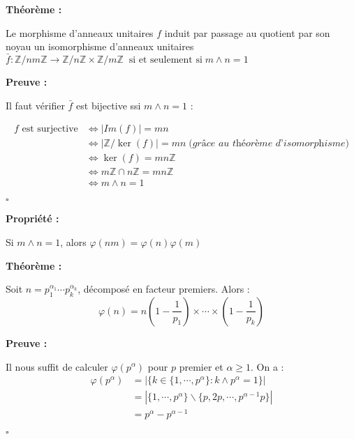 \documentclass{report}
\renewenvironment{leftbar}{%
  \def\FrameCommand{\vrule width 0.4pt \hspace{10pt}}%
  \MakeFramed {\advance\hsize-\width \FrameRestore}}%
 {\endMakeFramed}%
\newenvironment{preuve}{\vspace*{0.5cm}
    \begin{leftbar}
    \noindent\textbf{Preuve :}\par}{
    \begin{flushright}
    $\square$
    \end{flushright}
    \end{leftbar}
}
\newenvironment{prop}{\begin{tcolorbox}[colframe= white]
    \textbf{Propriété :}
     \par}
    {\end{tcolorbox}}
\newenvironment{theoreme}[1][]{
    \begin{tcolorbox}[]
    \textbf{Théorème :} #1  \par} 
    {\end{tcolorbox}}
\begin{document}
\begin{theoreme}
	Le morphisme d'anneaux unitaires $f$ induit par passage au quotient par son noyau un isomorphisme d'anneaux unitaires 
	$\bar{f} : \mathbb{Z}/nm\mathbb{Z} \rightarrow \mathbb{Z}/n\mathbb{Z} \times \mathbb{Z}/m\mathbb{Z}\; \; \text{si et seulement si}\; m\wedge n =1$
\end{theoreme}

\begin{preuve}
	Il faut vérifier $\bar{f}$ est bijective ssi $m \wedge n=1$ : \par
	\begin{equation*} 
	\begin{split}
		f \text{ est surjective}  & \iff | Im(f) | =mn \\
 		& \iff |\mathbb{Z}/\ker(f)| = mn \; \textit{(grâce au théorème d'isomorphisme)} \\ 
		& \iff \ker(f)= mn\mathbb{Z} \\ 
		& \iff m\mathbb{Z} \cap n\mathbb{Z} = mn\mathbb{Z} \\
		& \iff m \wedge n =1
	\end{split}
\end{equation*}
\end{preuve}

\begin{prop}
	Si $m \wedge n =1$, alors $\varphi (nm) = \varphi (n) \varphi (m)$
\end{prop}

\begin{theoreme}
	Soit $n=p_1^{\alpha_1} \cdots p_k^{\alpha_k}$, décomposé en facteur premiers. Alors : $$\varphi (n) = n \left (1-\frac{1}{p_1} \right )\times \cdots  \times \left (1-\frac{1}{p_k} \right ) $$
\end{theoreme}

\begin{preuve}
Il nous suffit de calculer $\varphi (p^\alpha)$ pour $p$ premier et $\alpha \geq 1$. On a : 
\begin{equation*} \label{eq1}
	\begin{split}
	\varphi (p^\alpha) & = | \{ k \in \{1, \cdots , p^\alpha \} : k \wedge p^\alpha =1 \}|  \\
	& = | \{ 1, \cdots , p^\alpha \} \backslash \{ p, 2p, \cdots , p^{\alpha -1}p \} | \\
	& =p^{\alpha}-p^{\alpha -1}
	\end{split}
\end{equation*}
\end{preuve}
\end{document}
